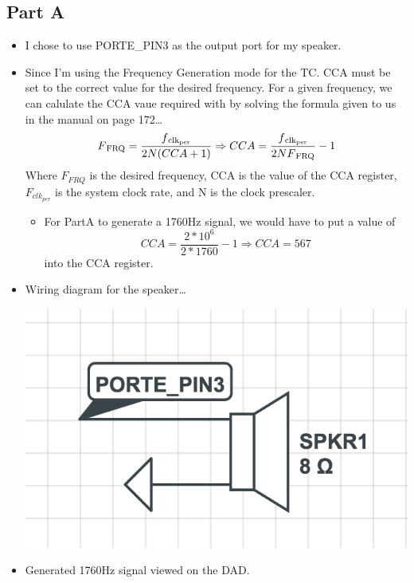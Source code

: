 \documentclass[letterpaper, 12pt]{article}
\begin{document}
\subsection*{Part A}
\begin{itemize}
  \item I chose to use PORTE\_PIN3 as the output port for my speaker.
  \item Since I'm using the Frequency Generation mode for the TC. CCA
    must be set to the correct value for the desired frequency. For a
    given frequency, we can calulate the CCA vaue required with by
    solving the formula given to us in the manual on page 172\ldots
    \[ F\textsubscript{FRQ} = \frac{f\textsubscript{clk\textsubscript{per}}}{2N(CCA+1)} \Rightarrow CCA = \frac{f\textsubscript{clk\textsubscript{per}}}{2NF\textsubscript{FRQ}} - 1 \]
    Where $F_{FRQ}$ is the desired frequency, CCA is the value of the CCA register, $F_{clk_{per}}$ is the system clock rate, and N is the clock prescaler.
      \begin{itemize}
          \item For PartA to generate a 1760Hz signal, we would have to put a value of
            \[ CCA = \frac{2*10^{6}}{2*1760} - 1 \Rightarrow CCA = 567 \] into the CCA register.
      \end{itemize}
    \item Wiring diagram for the speaker\ldots
      \begin{center}
        \includegraphics[scale=0.6]{speaker}
      \end{center}
    \item Generated 1760Hz signal viewed on the DAD.
      \begin{center}

\end{center}
\end{itemize}
\end{document}
